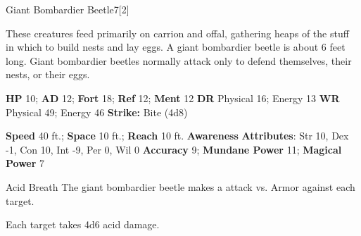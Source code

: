   \begin{monsection}{Giant Bombardier Beetle}{7}[2]
    \vspace{-1em}\vspace{-1em}
    \vspace{0em}

    
      These creatures feed primarily on carrion and offal, gathering heaps of the stuff in which to build nests and lay eggs.
      A giant bombardier beetle is about 6 feet long. Giant bombardier beetles normally attack only to defend themselves, their nests, or their eggs.
    

    \begin{spellcontent}
      \begin{spelltargetinginfo}
        \pari \textbf{HP} 10;
          \textbf{AD} 12;
          \textbf{Fort} 18;
          \textbf{Ref} 12;
          \textbf{Ment} 12
        \pari \textbf{DR} Physical 16; Energy 13
        \pari \textbf{WR} Physical 49; Energy 46
        \pari \textbf{Strike:}
            Bite  (4d8)
      \end{spelltargetinginfo}
    \end{spellcontent}
    \begin{monsterfooter}
      \pari \textbf{Speed} 40 ft.;
        \textbf{Space} 10 ft.;
        \textbf{Reach} 10 ft.
      \pari \textbf{Awareness} 
      \pari \textbf{Attributes}:
        Str 10, Dex -1,
        Con 10, Int -9,
        Per 0, Wil 0
      \pari \textbf{Accuracy} 9;
        \textbf{Mundane Power} 11;
      \textbf{Magical Power} 7
    \end{monsterfooter}
  \end{monsection}
  \begin{freeability}{Acid Breath}
       The giant bombardier beetle makes a  attack
        vs. Armor against each target.
    
    \hit Each target takes 4d6 acid damage.
    \end{freeability}
  
